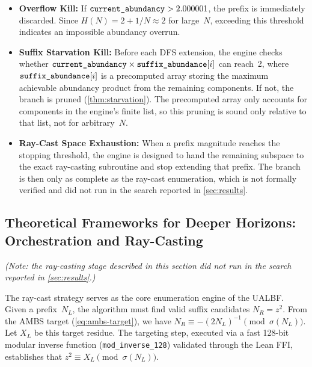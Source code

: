 \begin{itemize}
  \item \textbf{Overflow Kill:}
    If $\texttt{current\_\allowbreak{}abundancy} > 2.000001$, the
    prefix is immediately discarded.  Since
    $H(N) = 2 + 1/N \approx 2$ for large~$N$, exceeding this
    threshold indicates an impossible abundancy overrun.

  \item \textbf{Suffix Starvation Kill:}
    Before each DFS extension, the engine checks whether
    $\texttt{current\_\allowbreak{}abundancy}
     \times \texttt{suffix\_\allowbreak{}abundance}[i]$
    can reach~2, where $\texttt{suffix\_\allowbreak{}abundance}[i]$ is
    a precomputed array storing the maximum achievable abundancy product
    from the remaining components.  If not, the branch is pruned
    (\cref{thm:starvation}).  The precomputed array only accounts for
    components in the engine's finite list, so this pruning is sound
    only relative to that list, not for arbitrary~$N$.

  \item \textbf{Ray-Cast Space Exhaustion:}
    When a prefix magnitude reaches the stopping threshold, the engine is designed to hand the remaining subspace to the exact ray-casting subroutine and stop extending that prefix.  The branch is then only as complete as the ray-cast enumeration, which is not formally verified and did not run in the search reported in \cref{sec:results}.
\end{itemize}

\subsection{Theoretical Frameworks for Deeper Horizons: Orchestration and Ray-Casting}
\label{subsec:ray_casting}

\emph{(Note: the ray-casting stage described in this section did not
run in the search reported in \cref{sec:results}.)}

The ray-cast strategy serves as the core enumeration engine of the
UALBF\@.  Given a prefix~$N_L$, the algorithm must find valid suffix
candidates $N_R = z^2$.  From the AMBS target
(\cref{eq:ambs-target}), we have
$N_R \equiv -(2N_L)^{-1} \pmod{\sigma(N_L)}$.  Let $X_L$ be this
target residue.  The targeting step, executed via a fast 128-bit
modular inverse function
(\texttt{mod\_\allowbreak{}inverse\_\allowbreak{}128}) validated through
the Lean FFI, establishes that
$z^2 \equiv X_L \pmod{\sigma(N_L)}$.

